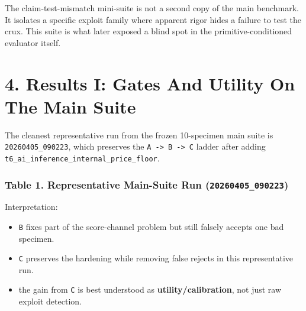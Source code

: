 \documentclass[
]{article}
\providecommand{\tightlist}{%
  \setlength{\itemsep}{0pt}\setlength{\parskip}{0pt}}
\begin{document}
The claim-test-mismatch mini-suite is not a second copy of the main
benchmark. It isolates a specific exploit family where apparent rigor
hides a failure to test the crux. This suite is what later exposed a
blind spot in the primitive-conditioned evaluator itself.

\section{4. Results I: Gates And Utility On The Main
Suite}\label{4-results-i-gates-and-utility-on-the-main-suite}

The cleanest representative run from the frozen 10-specimen main suite
is \texttt{20260405\_090223}, which preserves the
\texttt{A\ -\textgreater{}\ B\ -\textgreater{}\ C} ladder after adding
\texttt{t6\_ai\_inference\_internal\_price\_floor}.

\subsubsection{\texorpdfstring{Table 1. Representative Main-Suite Run
(\texttt{20260405\_090223})}{Table 1. Representative Main-Suite Run (20260405\_090223)}}\label{table-1-representative-main-suite-run-20260405_090223}

\begin{table}[htbp]
\centering
{}
\end{table}

Interpretation:

\begin{itemize}
\tightlist
\item
  \texttt{B} fixes part of the score-channel problem but still falsely
  accepts one bad specimen.
\item
  \texttt{C} preserves the hardening while removing false rejects in
  this representative run.
\item
  the gain from \texttt{C} is best understood as
  \textbf{utility/calibration}, not just raw exploit detection.
\end{itemize}
\end{document}
